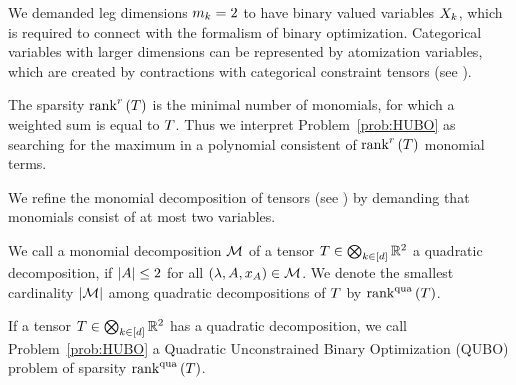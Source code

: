 \begin{remark}
	We demanded leg dimensions $m_{k}=2$ to have binary valued variables $X_{k}$, which is required to connect with the formalism of binary optimization.
	Categorical variables with larger dimensions can be represented by atomization variables, which are created by contractions with categorical constraint tensors (see ).
\end{remark}


The sparsity $\mathrm{rank}^{r}\left(T\right)$ is the minimal number of monomials, for which a weighted sum is equal to $T$.
Thus we interpret Problem~\ref{prob:HUBO} as searching for the maximum in a polynomial consistent of $\mathrm{rank}^{r}\left(T\right)$ monomial terms.





We refine the monomial decomposition of tensors (see ) by demanding that monomials consist of at most two variables.

\begin{definition}
	We call a monomial decomposition $\mathcal{M}$ of a tensor $T\in\bigotimes_{k\in[d]}\mathbb{R}^2$ a quadratic decomposition, if $\left|A\right|\leq 2$ for all $(\lambda,A,x_{A}) \in \mathcal{M}$.
	We denote the smallest cardinality $\left|\mathcal{M}\right|$ among quadratic decompositions of $T$ by $\mathrm{rank}^{\mathrm{qua}}\left(T\right)$.

	If a tensor $T\in\bigotimes_{k\in[d]}\mathbb{R}^2$ has a quadratic decomposition, we call Problem~\ref{prob:HUBO} a Quadratic Unconstrained Binary Optimization (QUBO) problem of sparsity $\mathrm{rank}^{\mathrm{qua}}\left(T\right)$.
\end{definition}


